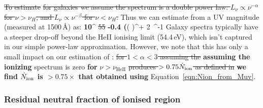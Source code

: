 \documentclass[fleqn,usenatbib]{mnras}
\providecommand{\DIFadd}[1]{{\protect\color{Green} {\bf #1}}} %
\providecommand{\DIFdel}[1]{{\protect\color{Gray} \scriptsize \sout{#1}}} %
\providecommand{\DIFaddbegin}{} %
\providecommand{\DIFaddend}{} %
\providecommand{\DIFdelbegin}{} %
\providecommand{\DIFdelend}{} %
\newcommand{\DIFscaledelfig}{0.5}
\newlength{\DIFdelgraphicswidth} %
\newlength{\DIFdelgraphicsheight} %
\newcommand{\DIFaddincludegraphics}[2][]{{\color{purple}\fbox{\DIFOincludegraphics[#1]{#2}}}} %
\newcommand{\DIFdelincludegraphics}[2][]{%
\sbox{\DIFdelgraphicsbox}{\DIFOincludegraphics[#1]{#2}}%
\settoboxwidth{\DIFdelgraphicswidth}{\DIFdelgraphicsbox} %
\settoboxtotalheight{\DIFdelgraphicsheight}{\DIFdelgraphicsbox} %
\scalebox{\DIFscaledelfig}{%
\parbox[b]{\DIFdelgraphicswidth}{\usebox{\DIFdelgraphicsbox}\\[-\baselineskip] \rule{\DIFdelgraphicswidth}{0em}}\llap{\resizebox{\DIFdelgraphicswidth}{\DIFdelgraphicsheight}{%
\setlength{\unitlength}{\DIFdelgraphicswidth}%
\begin{picture}(1,1)%
\thicklines\linethickness{2pt} %
{\color[rgb]{1,0,0}\put(0,0){\framebox(1,1){}}}%
{\color[rgb]{1,0,0}\put(0,0){\line( 1,1){1}}}%
{\color[rgb]{1,0,0}\put(0,1){\line(1,-1){1}}}%
\end{picture}%
}\hspace*{3pt}}} %
} %
\DeclareRobustCommand{\DIFaddbegin}{\DIFOaddbegin \let\includegraphics\DIFaddincludegraphics} %
\DeclareRobustCommand{\DIFaddend}{\DIFOaddend \let\includegraphics\DIFOincludegraphics} %
\DeclareRobustCommand{\DIFdelbegin}{\DIFOdelbegin \let\includegraphics\DIFdelincludegraphics} %
\DeclareRobustCommand{\DIFdelend}{\DIFOaddend \let\includegraphics\DIFOincludegraphics} %
\begin{document}
\DIFdelbegin \DIFdel{To estimate }%
\DIFdel{for galaxies we assume the spectrum is a double power law: $L_\nu \propto \nu^{-\alpha}$ for $\nu > \nu_H$, and $L_\nu \propto \nu^{-\beta}$ for $\nu < \nu_H$.
}\DIFdelend Thus we can estimate \Nion \DIFaddbegin \DIFadd{for galaxies }\DIFaddend from a UV magnitude (measured at 1500\,\AA) as:
%
\BE \label{eqn:Nion_from_Muv}
\Nion \approx \DIFdelbegin \DIFdel{5.2}%
\DIFdelend \DIFaddbegin \DIFadd{ 10}\DIFaddend ^{\DIFdelbegin \DIFdel{55}\DIFdelend \DIFaddbegin \DIFadd{-0.4 (}\MUV \DIFadd{+ 20)}\DIFaddend }\left(\DIFdelbegin \DIFdel{}%
\DIFdel{}%
\DIFdelend {}\right)^{\beta + 2} \,^{-1}
\EE
%
Galaxy spectra typically have a steeper drop-off beyond the HeII ionising limit (54.4\,eV), which isn't captured in our simple power-law approximation. However, we note that this has only a small impact on our estimation of \Nion: \DIFdelbegin \DIFdel{for $1 < \alpha < 3$ assuming the }\DIFdelend \DIFaddbegin \DIFadd{assuming the ionizing }\DIFaddend spectrum is zero \DIFaddbegin \DIFadd{for }\DIFaddend $\nu >\nu_\mathrm{HeII}$ \DIFdelbegin \DIFdel{produces $>0.75\Nion$ as defined in }\DIFdelend \DIFaddbegin \DIFadd{we find $\Nion$ is $>0.75\times$ that obtained using }\DIFaddend Equation~\eqref{eqn:Nion_from_Muv}.

\subsubsection{Residual neutral fraction of ionised region}
\label{sec:model_HIIregion_xHI}
\end{document}
